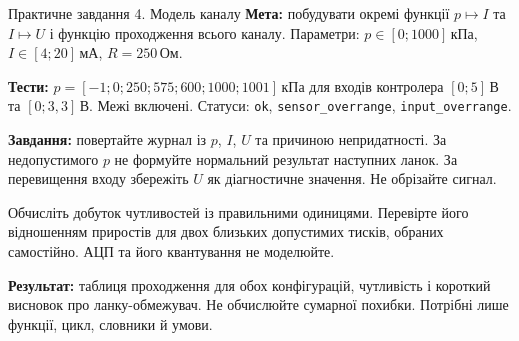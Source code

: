 \documentclass[aspectratio=169,11pt]{beamer}
\newcommand{\unit}[1]{\,\text{#1}}
\begin{document}
\begin{frame}[t]{Практичне завдання 4. Модель каналу}
\small
\textbf{Мета:} побудувати окремі функції $p\mapsto I$ та $I\mapsto U$ і функцію проходження всього каналу. Параметри: $p\in[0;1000]\unit{кПа}$, $I\in[4;20]\unit{мА}$, $R=250\unit{Ом}$.
\par\medskip
\textbf{Тести:} $p=[-1;0;250;575;600;1000;1001]\unit{кПа}$ для входів контролера $[0;5]\unit{В}$ та $[0;3{,}3]\unit{В}$. Межі включені. Статуси: \texttt{ok}, \texttt{sensor\_overrange}, \texttt{input\_overrange}.
\par\medskip
\textbf{Завдання:} повертайте журнал із $p$, $I$, $U$ та причиною непридатності. За недопустимого $p$ не формуйте нормальний результат наступних ланок. За перевищення входу збережіть $U$ як діагностичне значення. Не обрізайте сигнал.
\par\medskip
Обчисліть добуток чутливостей із правильними одиницями. Перевірте його відношенням приростів для двох близьких допустимих тисків, обраних самостійно. АЦП та його квантування не моделюйте.
\par\medskip
\textbf{Результат:} таблиця проходження для обох конфігурацій, чутливість і короткий висновок про ланку-обмежувач. Не обчислюйте сумарної похибки. Потрібні лише функції, цикл, словники й умови.
\end{frame}
\end{document}
